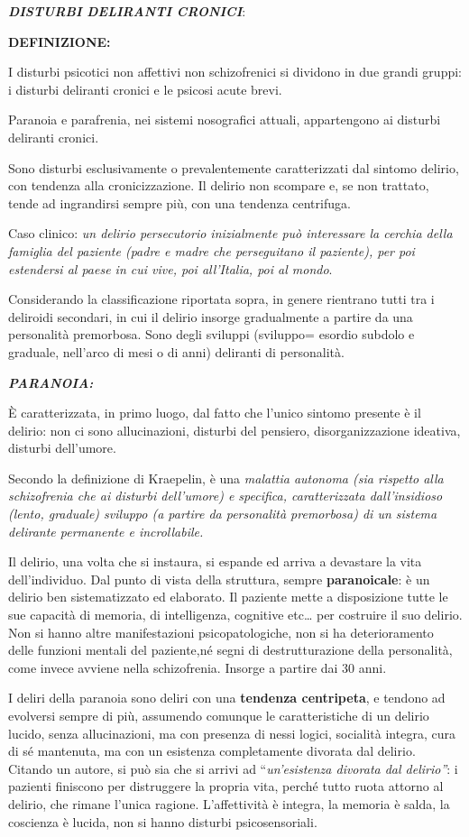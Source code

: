 \documentclass[]{article}
\date{}
\begin{document}
\textbf{\emph{DISTURBI DELIRANTI CRONICI}}:

\textbf{DEFINIZIONE:}

I disturbi psicotici non affettivi non schizofrenici si dividono in due
grandi gruppi: i disturbi deliranti cronici e le psicosi acute brevi.

Paranoia e parafrenia, nei sistemi nosografici attuali, appartengono ai
disturbi deliranti cronici.

Sono disturbi esclusivamente o prevalentemente caratterizzati dal
sintomo delirio, con tendenza alla cronicizzazione. Il delirio non
scompare e, se non trattato, tende ad ingrandirsi sempre più, con una
tendenza centrifuga.

Caso clinico: \emph{un delirio persecutorio inizialmente può interessare
la cerchia della famiglia del paziente (padre e madre che perseguitano
il paziente), per poi estendersi al paese in cui vive, poi all'Italia,
poi al mondo}.

Considerando la classificazione riportata sopra, in genere rientrano
tutti tra i deliroidi secondari, in cui il delirio insorge gradualmente
a partire da una personalità premorbosa. Sono degli sviluppi (sviluppo=
esordio subdolo e graduale, nell'arco di mesi o di anni) deliranti di
personalità.

\textbf{\emph{PARANOIA:}}

È caratterizzata, in primo luogo, dal fatto che l'unico sintomo presente
è il delirio: non ci sono allucinazioni, disturbi del pensiero,
disorganizzazione ideativa, disturbi dell'umore.

Secondo la definizione di Kraepelin, è una \emph{malattia autonoma (sia
rispetto alla schizofrenia che ai disturbi dell'umore) e specifica,
caratterizzata dall'insidioso (lento, graduale) sviluppo (a partire da
personalità premorbosa) di un sistema delirante permanente e
incrollabile. }

Il delirio, una volta che si instaura, si espande ed arriva a devastare
la vita dell'individuo. Dal punto di vista della struttura, sempre
\textbf{paranoicale}: è un delirio ben sistematizzato ed elaborato. Il
paziente mette a disposizione tutte le sue capacità di memoria, di
intelligenza, cognitive etc\ldots{} per costruire il suo delirio. Non si
hanno altre manifestazioni psicopatologiche, non si ha deterioramento
delle funzioni mentali del paziente,né segni di destrutturazione della
personalità, come invece avviene nella schizofrenia. Insorge a partire
dai 30 anni.

I deliri della paranoia sono deliri con una \textbf{tendenza
centripeta}, e tendono ad evolversi sempre di più, assumendo comunque le
caratteristiche di un delirio lucido, senza allucinazioni, ma con
presenza di nessi logici, socialità integra, cura di sé mantenuta, ma
con un esistenza completamente divorata dal delirio. Citando un autore,
si può sia che si arrivi ad ``\emph{un'esistenza divorata dal
delirio''}: i pazienti finiscono per distruggere la propria vita, perché
tutto ruota attorno al delirio, che rimane l'unica ragione.
L'affettività è integra, la memoria è salda, la coscienza è lucida, non
si hanno disturbi psicosensoriali.
\end{document}
